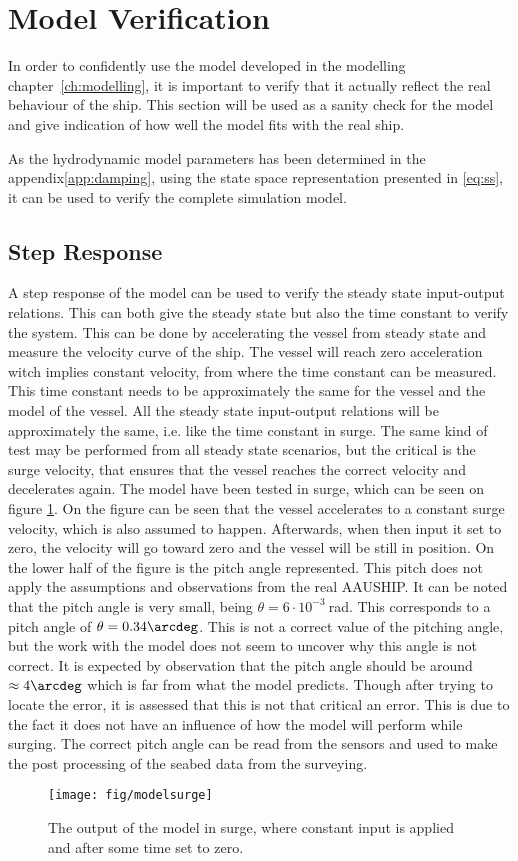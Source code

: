 \section{Model Verification}
\label{sec:model_verification}
In order to confidently use the model developed in the modelling chapter~\vref{ch:modelling}, it is important to verify that it actually reflect the real behaviour of the ship. This section will be used as a sanity check for the model and give indication of how well the model fits with the real ship.

As the hydrodynamic model parameters has been determined in the appendix\vref{app:damping}, using the state space representation presented in \vref{eq:ss}, it can be used to verify the complete simulation model.

\subsection{Step Response}
A step response of the model can be used to verify the steady state input-output relations. This can both give the steady state but also the time constant to verify the system. This can be done by accelerating the vessel from steady state and measure the velocity curve of the ship. The vessel will reach zero acceleration witch implies constant velocity, from where the time constant can be measured. This time constant needs to be approximately the same for the vessel and the model of the vessel. All the steady state input-output relations will be approximately the same, i.e. like the time constant in surge. The same kind of test may be performed from all steady state scenarios, but the critical is the surge velocity, that ensures that the vessel reaches the correct velocity and decelerates again. The model have been tested in surge, which can be seen on figure \ref{fig:surgevel}. On the figure can be seen that the vessel accelerates to a constant surge velocity, which is also assumed to happen. Afterwards, when then input it set to zero, the velocity will go toward zero and the vessel will be still in position. On the lower half of the figure is the pitch angle represented. This pitch does not apply the assumptions and observations from the real AAUSHIP. It can be noted that the pitch angle is very small, being $\theta = 6\cdot 10^{-3}\ $rad. This corresponds to a pitch angle of $\theta = 0.34\arcdeg$. This is not a correct value of the pitching angle, but the work with the model does not seem to uncover why this angle is not correct. It is expected by observation that the pitch angle should be around $\approx 4 \arcdeg$ which is far from what the model predicts. Though after trying to locate the error, it is assessed that this is not that critical an error. This is due to the fact it does not have an influence of how the model will perform while surging. The correct pitch angle can be read from the sensors and used to make the post processing of the seabed data from the surveying.
\begin{figure}
  \texttt{[image: fig/modelsurge]}
  \caption{The output of the model in surge, where constant input is applied and after some time set to zero.}
  \label{fig:surgevel}
\end{figure}

